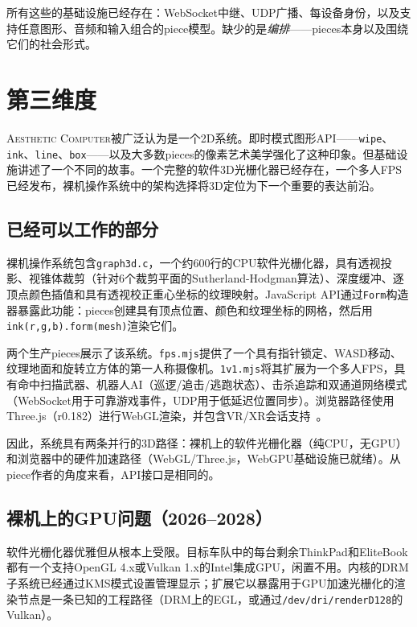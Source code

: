 \documentclass[10pt,letterpaper,twocolumn]{article}
\newcommand{\ac}{\textsc{Aesthetic Computer}}
\begin{document}
所有这些的基础设施已经存在：WebSocket中继、UDP广播、每设备身份，以及支持任意图形、音频和输入组合的piece模型。缺少的是\emph{编排}——pieces本身以及围绕它们的社会形式。


\section{第三维度}
\label{sec:3d}

\ac{}被广泛认为是一个2D系统。即时模式图形API——\texttt{wipe}、\texttt{ink}、\texttt{line}、\texttt{box}——以及大多数pieces的像素艺术美学强化了这种印象。但基础设施讲述了一个不同的故事。一个完整的软件3D光栅化器已经存在，一个多人FPS已经发布，裸机操作系统中的架构选择将3D定位为下一个重要的表达前沿。

\subsection{已经可以工作的部分}

裸机操作系统包含\texttt{graph3d.c}，一个约600行的CPU软件光栅化器，具有透视投影、视锥体裁剪（针对6个裁剪平面的Sutherland-Hodgman算法）、深度缓冲、逐顶点颜色插值和具有透视校正重心坐标的纹理映射。JavaScript API通过\texttt{Form}构造器暴露此功能：pieces创建具有顶点位置、颜色和纹理坐标的网格，然后用\texttt{ink(r,g,b).form(mesh)}渲染它们。

两个生产pieces展示了该系统。\texttt{fps.mjs}提供了一个具有指针锁定、WASD移动、纹理地面和旋转立方体的第一人称摄像机。\texttt{1v1.mjs}将其扩展为一个多人FPS，具有命中扫描武器、机器人AI（巡逻/追击/逃跑状态）、击杀追踪和双通道网络模式（WebSocket用于可靠游戏事件，UDP用于低延迟位置同步）。浏览器路径使用Three.js（r0.182）进行WebGL渲染，并包含VR/XR会话支持~\citep{sutherland1968head}。

因此，系统具有两条并行的3D路径：裸机上的软件光栅化器（纯CPU，无GPU）和浏览器中的硬件加速路径（WebGL/Three.js，WebGPU基础设施已就绪）。从piece作者的角度来看，API接口是相同的。

\subsection{裸机上的GPU问题（2026--2028）}

软件光栅化器优雅但从根本上受限。目标车队中的每台剩余ThinkPad和EliteBook都有一个支持OpenGL 4.x或Vulkan 1.x的Intel集成GPU，闲置不用。内核的DRM子系统已经通过KMS模式设置管理显示；扩展它以暴露用于GPU加速光栅化的渲染节点是一条已知的工程路径（DRM上的EGL，或通过\texttt{/dev/dri/renderD128}的Vulkan）。
\end{document}
